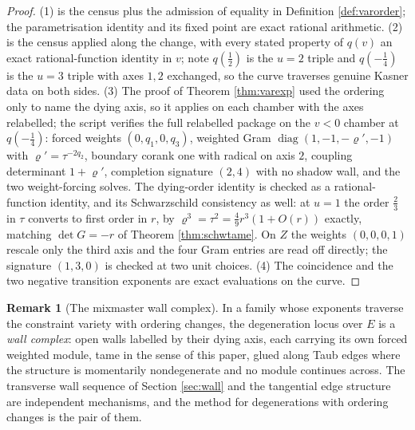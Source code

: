 \documentclass[11pt]{article}
\theoremstyle{definition}
\newtheorem{remark}[theorem]{Remark}
\begin{document}
\begin{proof}
(1) is the census plus the admission of equality in Definition \ref{def:varorder}; the parametrisation identity and its fixed point are exact rational arithmetic. (2) is the census applied along the change, with every stated property of $q(v)$ an exact rational-function identity in $v$; note $q(\tfrac12)$ is the $u=2$ triple and $q(-\tfrac14)$ is the $u=3$ triple with axes $1,2$ exchanged, so the curve traverses genuine Kasner data on both sides. (3) The proof of Theorem \ref{thm:varexp} used the ordering only to name the dying axis, so it applies on each chamber with the axes relabelled; the script verifies the full relabelled package on the $v<0$ chamber at $q(-\tfrac14)$: forced weights $(0,q_1,0,q_3)$, weighted Gram $\operatorname{diag}(1,-1,-\varrho',-1)$ with $\varrho' = \tau^{-2q_2}$, boundary corank one with radical on axis $2$, coupling determinant $1+\varrho'$, completion signature $(2,4)$ with no shadow wall, and the two weight-forcing solves. The dying-order identity is checked as a rational-function identity, and its Schwarzschild consistency as well: at $u=1$ the order $\tfrac23$ in $\tau$ converts to first order in $r$, by $\varrho^3 = \tau^2 = \tfrac49 r^3(1 + O(r))$ exactly, matching $\det G = -r$ of Theorem \ref{thm:schwtame}. On $Z$ the weights $(0,0,0,1)$ rescale only the third axis and the four Gram entries are read off directly; the signature $(1,3,0)$ is checked at two unit choices. (4) The coincidence and the two negative transition exponents are exact evaluations on the curve.
\end{proof}

\begin{remark}[The mixmaster wall complex]\label{rem:wallcomplex}
In a family whose exponents traverse the constraint variety with ordering changes, the degeneration locus over $E$ is a \emph{wall complex}: open walls labelled by their dying axis, each carrying its own forced weighted module, tame in the sense of this paper, glued along Taub edges where the structure is momentarily nondegenerate and no module continues across. The transverse wall sequence of Section \ref{sec:wall} and the tangential edge structure are independent mechanisms, and the method for degenerations with ordering changes is the pair of them.
\end{remark}
\end{document}
